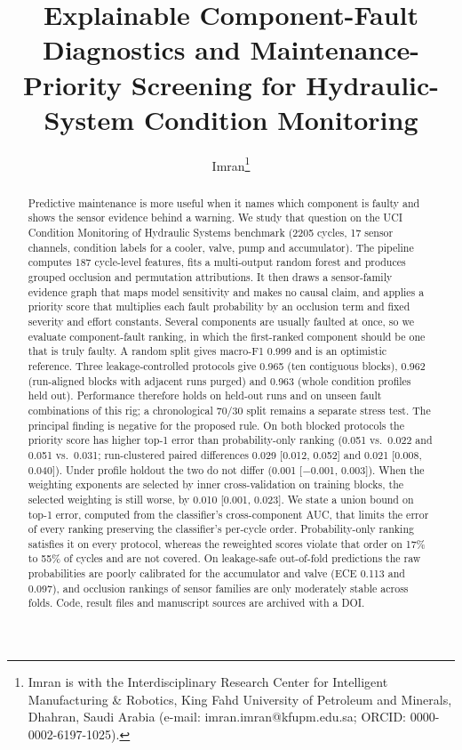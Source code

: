 \documentclass[journal]{IEEEtran}
\begin{document}
\title{Explainable Component-Fault Diagnostics and Maintenance-Priority Screening for Hydraulic-System Condition Monitoring}

\author{Imran\thanks{Imran is with the Interdisciplinary Research Center for Intelligent Manufacturing \& Robotics, King Fahd University of Petroleum and Minerals, Dhahran, Saudi Arabia (e-mail: imran.imran@kfupm.edu.sa; ORCID: \mbox{0000-0002-6197-1025}).}}

\maketitle

\begin{abstract}
Predictive maintenance is more useful when it names which component is faulty and shows the sensor evidence behind a warning. We study that question on the UCI Condition Monitoring of Hydraulic Systems benchmark (2205 cycles, 17 sensor channels, condition labels for a cooler, valve, pump and accumulator). The pipeline computes 187 cycle-level features, fits a multi-output random forest and produces grouped occlusion and permutation attributions. It then draws a sensor-family evidence graph that maps model sensitivity and makes no causal claim, and applies a priority score that multiplies each fault probability by an occlusion term and fixed severity and effort constants. Several components are usually faulted at once, so we evaluate component-fault ranking, in which the first-ranked component should be one that is truly faulty. A random split gives macro-F1 0.999 and is an optimistic reference. Three leakage-controlled protocols give 0.965 (ten contiguous blocks), 0.962 (run-aligned blocks with adjacent runs purged) and 0.963 (whole condition profiles held out). Performance therefore holds on held-out runs and on unseen fault combinations of this rig; a chronological 70/30 split remains a separate stress test. The principal finding is negative for the proposed rule. On both blocked protocols the priority score has higher top-1 error than probability-only ranking (0.051 vs.\ 0.022 and 0.051 vs.\ 0.031; run-clustered paired differences 0.029 [0.012, 0.052] and 0.021 [0.008, 0.040]). Under profile holdout the two do not differ (0.001 [$-$0.001, 0.003]). When the weighting exponents are selected by inner cross-validation on training blocks, the selected weighting is still worse, by 0.010 [0.001, 0.023]. We state a union bound on top-1 error, computed from the classifier's cross-component AUC, that limits the error of every ranking preserving the classifier's per-cycle order. Probability-only ranking satisfies it on every protocol, whereas the reweighted scores violate that order on 17\% to 55\% of cycles and are not covered. On leakage-safe out-of-fold predictions the raw probabilities are poorly calibrated for the accumulator and valve (ECE 0.113 and 0.097), and occlusion rankings of sensor families are only moderately stable across folds. Code, result files and manuscript sources are archived with a DOI.
\end{abstract}
\end{document}
